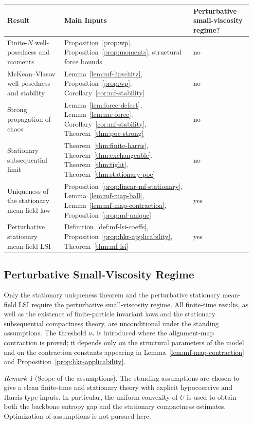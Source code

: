 \documentclass[11pt]{article}
\theoremstyle{definition}
\theoremstyle{remark}
\newtheorem{remark}[theorem]{Remark}
\begin{document}
\begin{center}
\footnotesize
\begin{tabular}{|p{}|p{}|p{}|}
\hline
\textbf{Result} & \textbf{Main Inputs} & \textbf{Perturbative small-viscosity regime?} \\
\hline
Finite-$N$ well-posedness and moments & Proposition~\ref{prop:wp}, Proposition~\ref{prop:moments}, structural force bounds & no \\
\hline
McKean--Vlasov well-posedness and stability & Lemma~\ref{lem:mf-lipschitz}, Proposition~\ref{prop:wp}, Corollary~\ref{cor:mf-stability} & no \\
\hline
Strong propagation of chaos & Lemma~\ref{lem:force-defect}, Lemma~\ref{lem:mc-force}, Corollary~\ref{cor:mf-stability}, Theorem~\ref{thm:poc-strong} & no \\
\hline
Stationary subsequential limit & Theorem~\ref{thm:finite-harris}, Theorem~\ref{thm:exchangeable}, Theorem~\ref{thm:tight}, Theorem~\ref{thm:stationary-poc} & no \\
\hline
Uniqueness of the stationary mean-field law & Proposition~\ref{prop:linear-mf-stationary}, Lemma~\ref{lem:mf-map-ball}, Lemma~\ref{lem:mf-map-contraction}, Proposition~\ref{prop:mf-unique} & yes \\
\hline
Perturbative stationary mean-field LSI & Definition~\ref{def:mf-lsi-coeffs}, Proposition~\ref{prop:hkr-applicability}, Theorem~\ref{thm:mf-lsi} & yes \\
\hline
\end{tabular}
\normalsize
\end{center}

\subsection*{Perturbative Small-Viscosity Regime}

Only the stationary uniqueness theorem and the perturbative stationary
mean-field LSI require the perturbative small-viscosity regime.
All finite-time results, as well as the existence of finite-particle invariant
laws and the stationary subsequential compactness theory, are unconditional
under the standing assumptions. The threshold \(\nu_*\) is introduced where the
alignment-map contraction is proved; it depends only on the structural
parameters of the model and on the contraction constants appearing in
Lemma~\ref{lem:mf-map-contraction} and
Proposition~\ref{prop:hkr-applicability}.

\begin{remark}[Scope of the assumptions]
The standing assumptions are chosen to give a clean finite-time and stationary
theory with explicit hypocoercive and Harris-type inputs. In particular, the
uniform convexity of \(U\) is used to obtain both the backbone entropy gap and
the stationary compactness estimates. Optimization of assumptions is not
pursued here.
\end{remark}
\end{document}
